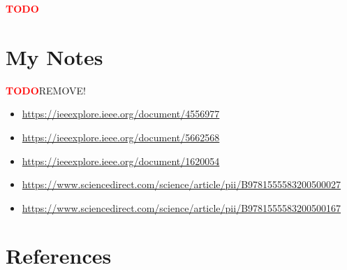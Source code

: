 \documentclass[11pt,a4paper]{article}
\newcommand{\TODO}{\textbf{\textcolor{red}{TODO}}} %
\theoremstyle{definition}
\begin{document}
    \TODO

\section{My Notes}

    \TODO REMOVE!

    \begin{itemize}
      \item \url{https://ieeexplore.ieee.org/document/4556977}\\[-8mm]
      \item \url{https://ieeexplore.ieee.org/document/5662568}\\[-8mm]
      \item \url{https://ieeexplore.ieee.org/document/1620054}\\[-8mm]
      \item \url{https://www.sciencedirect.com/science/article/pii/B9781555583200500027}\\[-8mm]
      \item \url{https://www.sciencedirect.com/science/article/pii/B9781555583200500167}\\[-8mm]
    \end{itemize}

\newpage

\section{References}

\begin{flushleft}
    
\end{flushleft}
\end{document}
